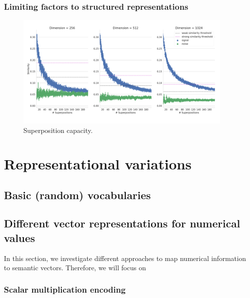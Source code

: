 \subsubsection{Limiting factors to structured representations}
\begin{figure}[t]
	\centering
	\includegraphics[width=0.95\textwidth]{imgs/spa_superposition_capacity.png}
	\caption{Superposition capacity.}
	\label{fig:spa_superposition_capacity}
\end{figure}

\section{Representational variations}
\subsection{Basic (random) vocabularies}
\subsection{Different vector representations for numerical values}
In this section, we investigate different approaches to map numerical information to semantic vectors.
Therefore, we will focus on
\subsubsection{Scalar multiplication encoding}
